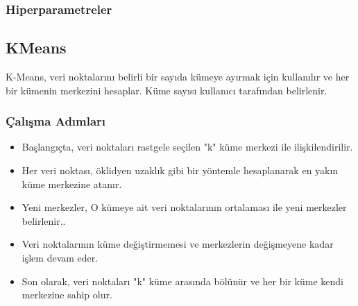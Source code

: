 \subsubsection{Hiperparametreler}
\begin{table}[h]
\centering
{\scriptsize\renewcommand{\arraystretch}{0.4}
{}}
\end{table}

\subsection{KMeans}
K-Means, veri noktalarını belirli bir sayıda kümeye ayırmak için kullanılır ve her bir kümenin merkezini hesaplar. Küme sayısı kullanıcı tarafından belirlenir.

\subsubsection{Çalışma Adımları}
\begin{itemize}
    \item Başlangıçta, veri noktaları rastgele seçilen "k" küme merkezi ile ilişkilendirilir.
    \item Her veri noktası, öklidyen uzaklık gibi bir yöntemle hesaplanarak en yakın küme merkezine atanır. 
    \item Yeni merkezler, O kümeye ait veri noktalarının ortalaması ile yeni merkezler belirlenir..
    \item Veri noktalarının küme değiştirmemesi ve merkezlerin değişmeyene kadar işlem devam eder.
    \item Son olarak, veri noktaları "k" küme arasında bölünür ve her bir küme kendi merkezine sahip olur.
\end{itemize}

